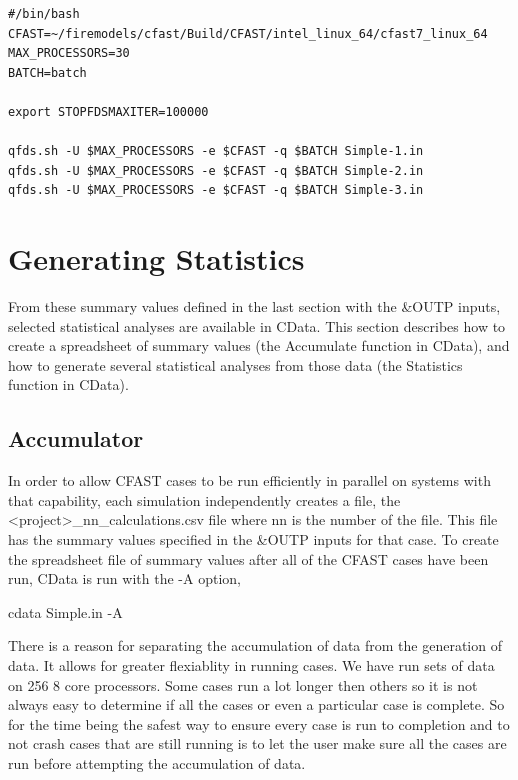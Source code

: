 \documentclass[12pt,twoside]{book}
\begin{document}
\begin{lstlisting}[basicstyle=\scriptsize]
#/bin/bash
CFAST=~/firemodels/cfast/Build/CFAST/intel_linux_64/cfast7_linux_64
MAX_PROCESSORS=30
BATCH=batch

export STOPFDSMAXITER=100000

qfds.sh -U $MAX_PROCESSORS -e $CFAST -q $BATCH Simple-1.in
qfds.sh -U $MAX_PROCESSORS -e $CFAST -q $BATCH Simple-2.in
qfds.sh -U $MAX_PROCESSORS -e $CFAST -q $BATCH Simple-3.in
\end{lstlisting}

\section{Generating Statistics}

From these summary values defined in the last section with the {\ct \&OUTP} inputs, selected statistical analyses are available in CData. This section describes how to create a spreadsheet of summary values (the Accumulate function in CData), and how to generate several statistical analyses from those data (the Statistics function in CData).

\subsection{Accumulator}

In order to allow CFAST cases to be run efficiently in parallel on systems with that capability, each simulation independently creates a file, the {\ct <project>\_nn\_calculations.csv} file where {\ct nn} is the number of the file. This file has the summary values specified in the {\ct \&OUTP} inputs for that case. To create the spreadsheet file of summary values after all of the CFAST cases have been run, CData is run with the {\ct -A} option,

\vspace{\baselineskip}
{\ct cdata Simple.in -A}

There is a reason for separating the accumulation of data from the generation of data. It allows for greater flexiablity in running cases. We have run sets of data on 256 8 core processors. Some cases run a lot longer then others so it is not always easy to determine if all the cases or even a particular case is complete. So for the time being the safest way to ensure every case is run to completion and to not crash cases that are still running is to let the user make sure all the cases are run before attempting the accumulation of data.
\end{document}
